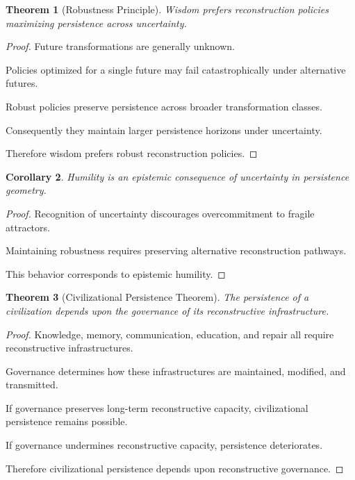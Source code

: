 \documentclass[12pt,oneside]{article}
\newtheorem{theorem}{Theorem}[section] \newtheorem{lemma}[theorem]{Lemma} \newtheorem{proposition}[theorem]{Proposition} \newtheorem{corollary}[theorem]{Corollary}
\theoremstyle{definition}
\begin{document}
\begin{theorem}[Robustness Principle]

Wisdom prefers reconstruction policies maximizing persistence across uncertainty.

\end{theorem}

\begin{proof}

Future transformations are generally unknown.

Policies optimized for a single future may fail catastrophically under alternative futures.

Robust policies preserve persistence across broader transformation classes.

Consequently they maintain larger persistence horizons under uncertainty.

Therefore wisdom prefers robust reconstruction policies.

\end{proof}

\begin{corollary}

Humility is an epistemic consequence of uncertainty in persistence geometry.

\end{corollary}

\begin{proof}

Recognition of uncertainty discourages overcommitment to fragile attractors.

Maintaining robustness requires preserving alternative reconstruction pathways.

This behavior corresponds to epistemic humility.

\end{proof}

\begin{theorem}[Civilizational Persistence Theorem]

The persistence of a civilization depends upon the governance of its reconstructive infrastructure.

\end{theorem}

\begin{proof}

Knowledge, memory, communication, education, and repair all require reconstructive infrastructures.

Governance determines how these infrastructures are maintained, modified, and transmitted.

If governance preserves long-term reconstructive capacity, civilizational persistence remains possible.

If governance undermines reconstructive capacity, persistence deteriorates.

Therefore civilizational persistence depends upon reconstructive governance.

\end{proof}
\end{document}
